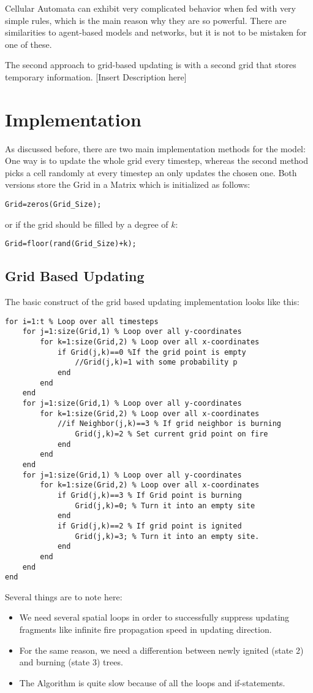 \documentclass[11pt]{article}
\begin{document}
Cellular Automata can exhibit very complicated behavior when fed with very simple rules, which is the main reason why they are so powerful. There are similarities to agent-based models and networks, but it is not to be mistaken for one of these.


The second approach to grid-based updating is with a second grid that stores temporary information. [Insert Description here]


\section{Implementation}
As discussed before, there are two main implementation methods for the model: One way is to update the whole grid every timestep, whereas the second method picks a cell randomly at every timestep an only updates the chosen one.
Both versions store the Grid in a Matrix which is initialized as follows:
\begin{verbatim}
Grid=zeros(Grid_Size);
\end{verbatim}
or if the grid should be filled by a degree of $k$:
\begin{verbatim}
Grid=floor(rand(Grid_Size)+k);
\end{verbatim}
\subsection{Grid Based Updating}
The basic construct of the grid based updating implementation looks like this:
\begin{verbatim}
for i=1:t % Loop over all timesteps
	for j=1:size(Grid,1) % Loop over all y-coordinates
		for k=1:size(Grid,2) % Loop over all x-coordinates
			if Grid(j,k)==0 %If the grid point is empty
				//Grid(j,k)=1 with some probability p
			end
		end
	end
	for j=1:size(Grid,1) % Loop over all y-coordinates
		for k=1:size(Grid,2) % Loop over all x-coordinates
			//if Neighbor(j,k)==3 % If grid neighbor is burning
				Grid(j,k)=2 % Set current grid point on fire
			end
		end
	end
	for j=1:size(Grid,1) % Loop over all y-coordinates
		for k=1:size(Grid,2) % Loop over all x-coordinates
			if Grid(j,k)==3 % If Grid point is burning
				Grid(j,k)=0; % Turn it into an empty site
			end
			if Grid(j,k)==2 % If grid point is ignited
				Grid(j,k)=3; % Turn it into an empty site.
			end
		end
	end
end
\end{verbatim}
Several things are to note here:
\begin{itemize}
\item We need several spatial loops in order to successfully suppress updating fragments like infinite fire propagation speed in updating direction. 
\item For the same reason, we need a differention between newly ignited (state 2) and burning (state 3) trees. 
\item The Algorithm is quite slow because of all the loops and if-statements.
\end{itemize}
\end{document}
